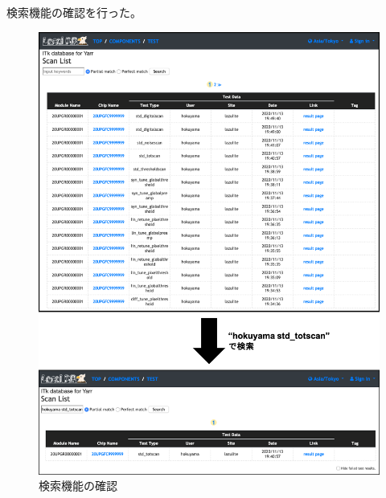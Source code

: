 検索機能の確認を行った。
\begin{figure}[bpt]\centering
\includegraphics[width=12cm]{demo_search_function}
\caption[検索機能の確認]{検索機能の確認}
\label{demo_search_function}
\end{figure}

\newpage
